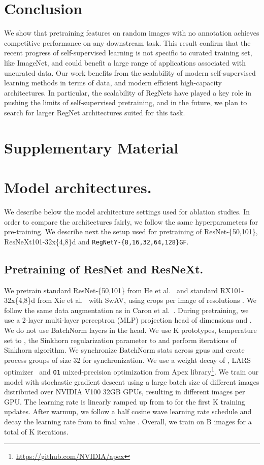 \documentclass[final]{cvpr}
\begin{document}
\section{Conclusion}
We show that pretraining features on random images with no annotation achieves competitive performance on any downstream task.
This result confirm that the recent progress of self-supervised learning is not specific to curated training set, like ImageNet, and could benefit a large range of applications associated with uncurated data.
Our work benefits from the scalability of modern self-supervised learning methods in terms of data, and modern efficient high-capacity architectures. 
In particular, the scalability of RegNets have played a key role in pushing the limits of self-supervised pretraining, and in the future, we plan to search for larger RegNet architectures suited for this task. 

{\small


}

\newpage
\section*{Supplementary Material}
\section{Model architectures.}
We describe below the model architecture settings used for ablation studies. In order to compare the architectures fairly, we follow the same hyperparameters for pre-training. We describe next the setup used for pretraining of ResNet-\{50,101\}, ResNeXt101-32x\{4,8\}d and \texttt{RegNetY-\{8,16,32,64,128\}GF}.

\subsection{Pretraining of ResNet and ResNeXt.}

We pretrain standard ResNet-\{50,101\} from He et al.~\cite{he2016deep} and standard RX101-32x\{4,8\}d from Xie et al.~\cite{xie2017aggregated} with SwAV, using  crops per image of resolutions . 
We follow the same data augmentation as in Caron et al.~\cite{caron2020unsupervised}.
During pretraining, we use a 2-layer multi-layer perceptron (MLP) projection head of dimensions  and . We do not use BatchNorm layers in the head.
We use K prototypes, temperature  set to , the Sinkhorn regularization parameter  to  and perform  iterations of Sinkhorn algorithm.
We synchronize BatchNorm stats across gpus and create process groups of size 32 for synchronization.
We use a weight decay of , LARS optimizer~\cite{you2017large} and \texttt{O1} mixed-precision optimization from Apex library\footnote{\url{https://github.com/NVIDIA/apex}}. 
We train our model with stochastic gradient descent using a large batch size of  different images distributed over  NVIDIA V100 32GB GPUs, resulting in  different images per GPU. 
The learning rate is linearly ramped up from  to  for the first K training updates. 
After warmup, we follow a half cosine wave learning rate schedule and decay the learning rate from  to final value .
Overall, we train on B images for a total of K iterations.
\end{document}
